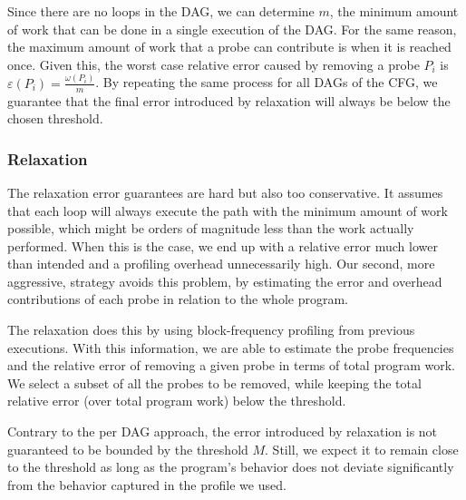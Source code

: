     Since there are no loops in the DAG, we can determine $m$, the minimum amount of work that can be done in a single execution of the
    DAG. For the same reason, the maximum amount of work that a probe can contribute is when it is reached once. Given this, the worst case
    relative error caused by removing a probe $P_i$ is $\varepsilon(P_i) = \frac{\omega(P_i)}{m}$. By repeating the same process for
    all DAGs of the CFG, we guarantee that the final error introduced by relaxation will always be below the chosen threshold.

    \subsubsection{\WPRelaxTitle Relaxation}

    The \WCRelaxLower relaxation error guarantees are hard but also too conservative. It assumes that each loop will always execute the
    path with the minimum amount of work possible, which might be orders of magnitude less than the work actually performed. When this is
    the case, we end up with a relative error much lower than intended and a profiling overhead unnecessarily high. Our second, more
    aggressive, strategy avoids this problem, by estimating the error and overhead contributions of each probe in relation to the whole
    program.

    The \WPRelaxLower relaxation does this by using block-frequency profiling from previous executions. With this information, we are able
    to estimate the probe frequencies and the relative error of removing a given probe in terms of total program work. We select a subset
    of all the probes to be removed, while keeping the total relative error (over total program work) below the threshold.

    Contrary to the per DAG approach, the error introduced by \WPRelaxLower relaxation is not guaranteed to be bounded by the threshold
    $M$. Still, we expect it to remain close to the threshold as long as the program's behavior does not deviate significantly from the
    behavior captured in the profile we used.

